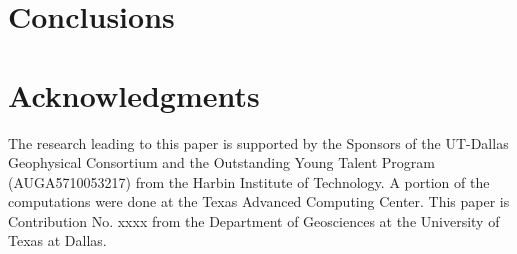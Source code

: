 \documentclass[manuscript,ulem,graphix,revised]{geophysics}
\begin{document}
\section{Conclusions}



\section{Acknowledgments}

The research leading to this paper is supported by the Sponsors of the
UT-Dallas Geophysical Consortium and the Outstanding Young Talent Program (AUGA5710053217) from the Harbin Institute of Technology. A portion of the computations were done at the Texas Advanced Computing Center. This paper is Contribution No. xxxx
from the Department of Geosciences at the University of Texas at Dallas.



\newpage


\end{document}
